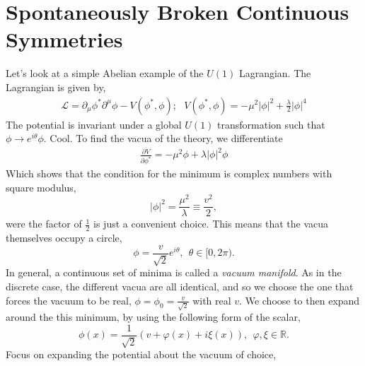 \section{Spontaneously Broken Continuous Symmetries}
Let's look at a simple Abelian example of the $U(1)$ Lagrangian. The Lagrangian is given by, 
\begin{equation}
    \begin{split}
        \mathcal{L} = \partial_{\mu}\phi^*\partial^{\mu}\phi - V(\phi^*, \phi); \ \ \ V(\phi^*,\phi) = -\mu^2|\phi|^2 +\frac{\lambda}{2}|\phi|^4
    \end{split}
\end{equation}
The potential is invariant under a global $U(1)$ transformation such that $\phi\rightarrow e^{i\theta}\phi$. Cool. To find the vacua of the theory, we differentiate 
\begin{equation}
    \begin{split}
        \frac{\partial V}{\partial\phi^*} = -\mu^2\phi + \lambda|\phi|^2\phi
    \end{split}
\end{equation}
Which shows that the condition for the minimum is complex numbers with square modulus, 
\begin{equation}
    |\phi|^2 = \frac{\mu^2}{\lambda} \equiv \frac{v^2}{2}, 
\end{equation}
were the factor of $\frac{1}{2}$ is just a convenient choice. This means that the vacua themselves occupy a circle, 
\begin{equation}
    \phi = \frac{v}{\sqrt{2}}e^{i\theta}, \ \ \theta\in[0, 2\pi).
\end{equation}
In general, a continuous set of minima is called a \textit{vacuum manifold}. As in the discrete case, the different vacua are all identical, and so we choose the one that forces the vacuum to be real, $\phi = \phi_0 = \frac{v}{\sqrt{2}}$ with real $v$. We choose to then expand around the this minimum, by using the following form of the scalar, 
\begin{equation}
    \phi(x) = \frac{1}{\sqrt{2}}(v + \varphi(x) + i\xi(x)), \ \ \varphi,\xi \in \mathbb{R}.
\end{equation}
Focus on expanding the potential about the vacuum of choice, 
